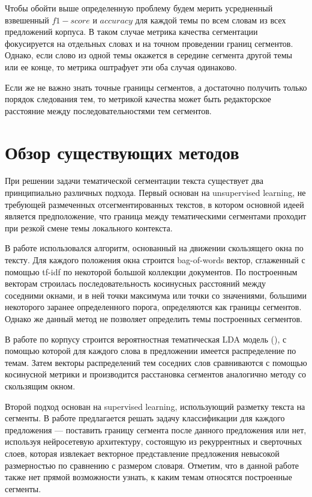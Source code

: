 \documentclass[pdftex,ptm,12pt,a4paper]{report}
\theoremstyle{definition}
\begin{document}
Чтобы обойти выше определенную проблему будем мерить усредненный взвешенный $f1-score$ и $accuracy$ для каждой темы по всем словам из всех предложений корпуса. В таком случае метрика качества сегментации фокусируется на отдельных словах и на точном проведении границ сегментов. Однако, если слово из одной темы окажется в середине сегмента другой темы или ее конце, то метрика оштрафует эти оба случая одинаково.  

Если же не важно знать точные границы сегментов, а достаточно получить только порядок следования тем, то метрикой качества может быть редакторское расстояние между последовательностями тем сегментов.  
 

\section{Обзор существующих методов}\label{old}

При решении задачи тематической сегментации текста существует два принципиально различных подхода. Первый основан на unsupervised learning, не требующей размеченных отсегментированных текстов, в котором основной идеей является предположение, что граница между тематическими сегментами проходит при резкой смене темы локального контекста.

В работе \cite{Hearst} использовался алгоритм, основанный на движении скользящего окна по тексту. Для каждого положения окна строится bag-of-words вектор, сглаженный с помощью tf-idf по некоторой большой коллекции документов. По построенным векторам строилась последовательность косинусных расстояний между соседними окнами, и в ней точки максимума или точки со значениями, большими некоторого заранее определенного порога, определяются как границы сегментов. Однако же данный метод не позволяет определить темы построенных сегментов. 

В работе \cite{Riedl_textsegmentation} по корпусу строится вероятностная тематическая LDA модель (\cite{Blei:2003:LDA:944919.944937}), с помощью которой для каждого слова в предложении имеется распределение по темам. Затем векторы распределений тем соседних слов сравниваются с помощью косинусной метрики и производится расстановка сегментов аналогично методу со скользящим окном.  

Второй подход основан на supervised learning, использующий разметку текста на сегменты. В работе \cite{Wang2016} предлагается решать задачу классификации для каждого предложения --- поставить границу сегмента после данного предложения или нет, используя нейросетевую архитектуру, состоящую из рекуррентных и сверточных слоев, которая извлекает векторное представление предложения невысокой размерностью по сравнению с размером словаря. Отметим, что в данной работе также нет прямой возможности узнать, к каким темам относятся построенные сегменты.
\end{document}

